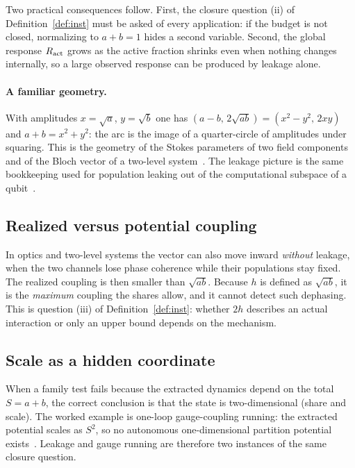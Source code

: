 \documentclass[11pt]{article}
\theoremstyle{definition}
\theoremstyle{remark}
\begin{document}
Two practical consequences follow. First, the closure question (ii) of
Definition~\ref{def:inst} must be asked of every application: if the budget is not closed,
normalizing to $a+b=1$ hides a second variable. Second, the global response $R_{\rm act}$
grows as the active fraction shrinks even when nothing changes internally, so a large
observed response can be produced by leakage alone.

\paragraph{A familiar geometry.} With amplitudes $x=\sqrt a$, $y=\sqrt b$ one has
$(a-b,\,2\sqrt{ab})=(x^2-y^2,\,2xy)$ and $a+b=x^2+y^2$: the arc is the image of a
quarter-circle of amplitudes under squaring. This is the geometry of the Stokes parameters
of two field components~\cite{Stokes1852} and of the Bloch vector of a two-level
system~\cite{Bloch1946}. The leakage picture is the same bookkeeping used for population
leaking out of the computational subspace of a qubit~\cite{WoodGambetta2018}.

\subsection{Realized versus potential coupling}
In optics and two-level systems the vector can also move inward \emph{without} leakage, when
the two channels lose phase coherence while their populations stay fixed. The realized
coupling is then smaller than $\sqrt{ab}$. Because $h$ is defined as $\sqrt{ab}$, it is the
\emph{maximum} coupling the shares allow, and it cannot detect such dephasing. This is
question (iii) of Definition~\ref{def:inst}: whether $2h$ describes an actual interaction or
only an upper bound depends on the mechanism.

\subsection{Scale as a hidden coordinate}
When a family test fails because the extracted dynamics depend on the total $S=a+b$, the
correct conclusion is that the state is two-dimensional (share and scale). The worked
example is one-loop gauge-coupling running: the extracted potential scales as $S^2$, so no
autonomous one-dimensional partition potential exists~\cite{DeJesus2026EP}. Leakage and
gauge running are therefore two instances of the same closure question.

\end{document}

